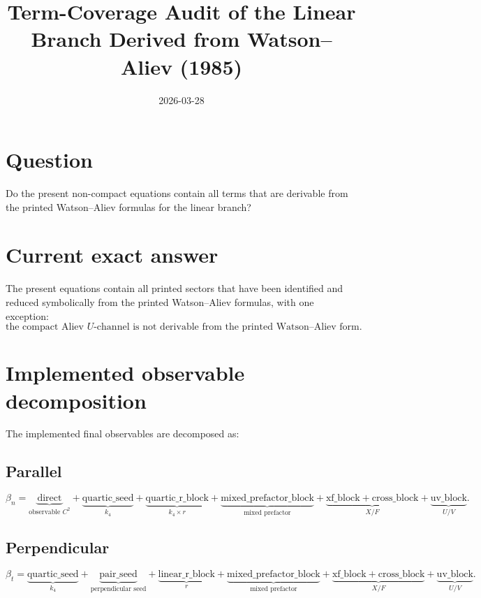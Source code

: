 \documentclass[11pt]{article}
\title{Term-Coverage Audit of the Linear Branch Derived from Watson--Aliev (1985)}
\author{}
\date{2026-03-28}
\begin{document}
\maketitle

\section*{Question}

Do the present non-compact equations contain all terms that are derivable from the printed Watson--Aliev formulas for the linear branch?

\section*{Current exact answer}

The present equations contain all printed sectors that have been identified and reduced symbolically from the printed Watson--Aliev formulas, with one exception:
\[
\boxed{
\text{the compact Aliev }U\text{-channel is not derivable from the printed Watson--Aliev form.}
}
\]

\section*{Implemented observable decomposition}

The implemented final observables are decomposed as:

\subsection*{Parallel}
\[
\beta_n=
\underbrace{\mathrm{direct}}_{\text{observable }C^2}
+
\underbrace{\mathrm{quartic\_seed}}_{k_4}
+
\underbrace{\mathrm{quartic\_r\_block}}_{k_4\times r}
+
\underbrace{\mathrm{mixed\_prefactor\_block}}_{\text{mixed prefactor}}
+
\underbrace{\mathrm{xf\_block}+\mathrm{cross\_block}}_{X/F}
+
\underbrace{\mathrm{uv\_block}}_{U/V}.
\]

\subsection*{Perpendicular}
\[
\beta_t=
\underbrace{\mathrm{quartic\_seed}}_{k_4}
+
\underbrace{\mathrm{pair\_seed}}_{\text{perpendicular seed}}
+
\underbrace{\mathrm{linear\_r\_block}}_{r}
+
\underbrace{\mathrm{mixed\_prefactor\_block}}_{\text{mixed prefactor}}
+
\underbrace{\mathrm{xf\_block}+\mathrm{cross\_block}}_{X/F}
+
\underbrace{\mathrm{uv\_block}}_{U/V}.
\]
\end{document}
